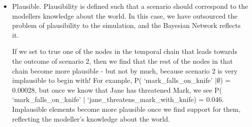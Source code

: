\begin{itemize}
\item Plausible. Plausibility is defined such that a scenario should correspond to the modellers knowledge about the world. In this case, we have outsourced the problem of plausibility to the simulation, and the Bayesian Network reflects it. 

If we set to true one of the nodes in the temporal chain that leads towards the outcome of scenario 2, then we find that the rest of the nodes in that chain become more plausible - but not by much, because scenario 2 is very implausible to begin with! For example, P( `mark\_falls\_on\_knife' $| \emptyset$) = 0.00028, but once we know that Jane has threatened Mark, we see P( `mark\_falls\_on\_knife' $|$ `jane\_threatens\_mark\_with\_knife) = 0.046. Implausible elements become more plausible once we find support for them, reflecting the modeller's knowledge about the world.

\end{itemize}





